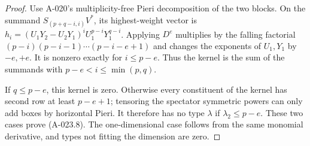 \begin{proof}
Use A-020's multiplicity-free Pieri decomposition of the two
blocks. On the summand $S_{(p+q-i,i)}V^*$, its highest-weight
vector is
$h_i=(U_1Y_2-U_2Y_1)^iU_1^{p-i}Y_1^{q-i}$.
Applying $D^e$ multiplies by the falling factorial
$(p-i)(p-i-1)\cdots(p-i-e+1)$ and changes the exponents
of $U_1,Y_1$ by $-e,+e$. It is nonzero exactly for
$i\leq p-e$. Thus the kernel is the sum of the summands
with $p-e<i\leq\min(p,q)$.

If $q\leq p-e$, this kernel is zero. Otherwise every
constituent of the kernel has second row at least $p-e+1$;
tensoring the spectator symmetric powers can only add boxes
by horizontal Pieri. It therefore has no type $\lambda$
if $\lambda_2\leq p-e$. These two cases prove (A-023.8).
The one-dimensional case follows from the same monomial
derivative, and types not fitting the dimension are zero.
\end{proof}

